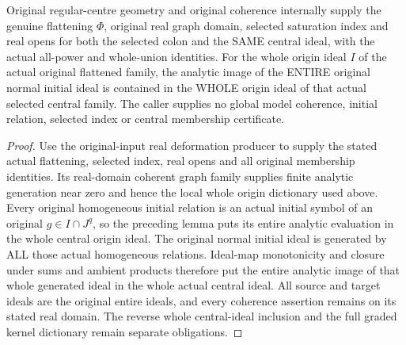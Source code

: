 \begin{theorem}
\label{hir:real-domain-original-entire-initial-ideal-inclusion}
\leanok
Original regular-centre geometry and original coherence internally
supply the genuine flattening $\Phi$, original real graph domain,
selected saturation index and real opens for both the selected colon
and the SAME central ideal, with the actual all-power and whole-union
identities. For the whole origin ideal $I$ of the actual original
flattened family, the analytic image of the ENTIRE original normal
initial ideal is contained in the WHOLE origin ideal of that actual
selected central family. The caller supplies no global model
coherence, initial relation, selected index or central membership
certificate.
\end{theorem}
\begin{proof}
Use the original-input real deformation producer to supply the stated
actual flattening, selected index, real opens and all original
membership identities. Its real-domain coherent graph family supplies
finite analytic generation near zero and hence the local whole origin
dictionary used above. Every original homogeneous initial relation is
an actual initial symbol of an original $g\in I\cap J^q$, so the
preceding lemma puts its entire analytic evaluation in the whole
central origin ideal. The original normal initial ideal is generated
by ALL those actual homogeneous relations. Ideal-map monotonicity and
closure under sums and ambient products therefore put the entire
analytic image of that whole generated ideal in the whole actual
central ideal. All source and target ideals are the original entire
ideals, and every coherence assertion remains on its stated real
domain. The reverse whole central-ideal inclusion and the full graded
kernel dictionary remain separate obligations.
\end{proof}

